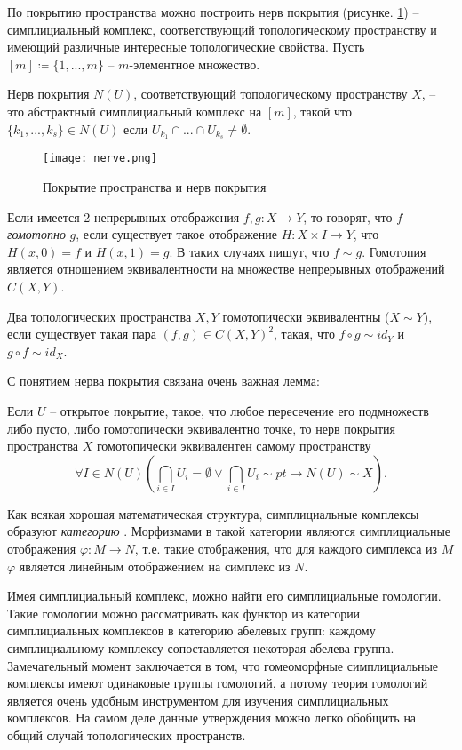 По покрытию пространства можно построить нерв покрытия  (рисунке. \ref{nerve}) -- симплициальный комплекс, соответствующий топологическому пространству и имеющий различные интересные топологические свойства. Пусть $ [m] \coloneqq \{1, ..., m\} $ -- $m$-элементное множество.
\begin{definition}
	Нерв покрытия $N(U)$, соответствующий топологическому пространству $X$, -- это абстрактный симплициальный комплекс на $[m]$, такой что $ \{k_1, ..., k_s\} \in N(U) $ если $ U_{k_1} \cap ... \cap U_{k_s} \neq \emptyset $.
\end{definition}
\begin{figure}[h!]
	\begin{center}
		\texttt{[image: nerve.png]}\\
		\caption{Покрытие пространства и нерв покрытия}
		\label{nerve}
	\end{center}
\end{figure}
Если имеется 2 непрерывных отображения $f, g : X \to Y$, то говорят, что $f$ {\it гомотопно} $g$, если существует такое отображение ${H: X\times I \to Y}$, что ${H(x,0) = f}$ и ${H(x,1) = g}$. В таких случаях пишут, что ${f \sim g}$. Гомотопия является отношением эквивалентности на множестве непрерывных отображений ${ C(X,Y) }$.


Два топологических пространства $X,Y$ гомотопически эквивалентны (${X \sim Y}$), если существует такая пара ${(f,g) \in C(X,Y)^2}$, такая, что ${f \circ g \sim id_Y}$ и ${g \circ f \sim id_X}$.

С понятием нерва покрытия связана очень важная лемма:
\begin{lemma*}[о нерве]
	Если $U$ -- открытое покрытие, такое, что любое пересечение его подмножеств либо пусто, либо гомотопически эквивалентно точке, то нерв покрытия пространства $X$ гомотопически эквивалентен самому пространству
	\[ \forall I \in N(U) \left( \bigcap\limits_{i \in I} U_i = \emptyset \lor \bigcap\limits_{i \in I} U_i \sim pt \rightarrow N(U) \sim X \right). \]
\end{lemma*}

Как всякая хорошая математическая структура, симплициальные комплексы образуют {\it категорию} . Морфизмами в такой категории являются симплициальные отображения $\varphi : M \to N$, т.е. такие отображения, что для каждого симплекса из $M$ $\varphi$ является линейным отображением на симплекс из $N$. 

Имея симплициальный комплекс, можно найти его симплициальные гомологии. Такие гомологии можно рассматривать как функтор из категории симплициальных комплексов в категорию абелевых групп: каждому симплициальному комплексу сопоставляется некоторая абелева группа. Замечательный момент заключается в том, что гомеоморфные симплициальные комплексы имеют одинаковые группы гомологий, а потому теория гомологий является очень удобным инструментом для изучения симплициальных комплексов. На самом деле данные утверждения можно легко обобщить на общий случай топологических пространств.

